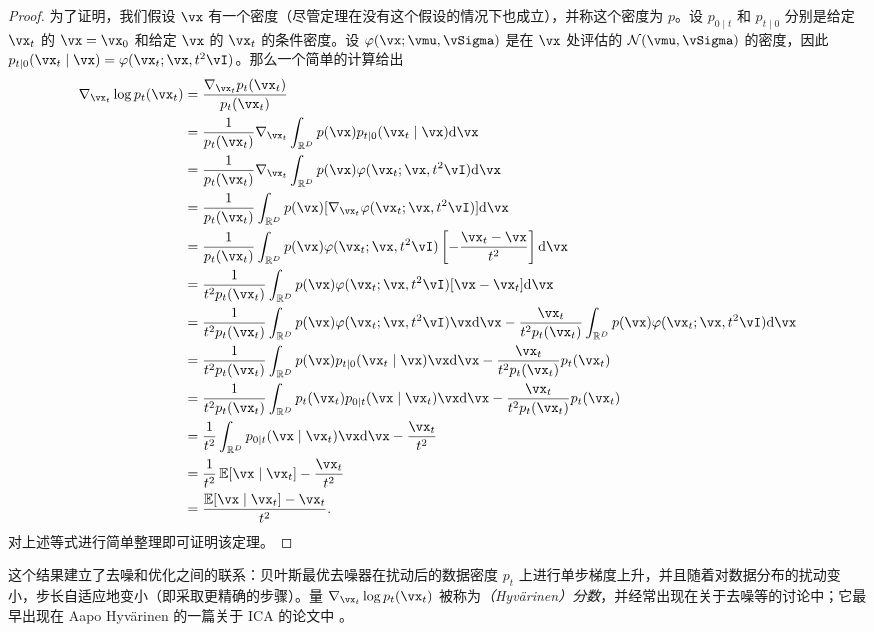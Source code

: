 \documentclass[../../book-main_zh.tex]{subfiles}
\begin{document}
\begin{proof}
	为了证明，我们假设 \(\vx\) 有一个密度（尽管定理在没有这个假设的情况下也成立），并称这个密度为 \(p\)。设 \(p_{0 \mid t}\) 和 \(p_{t \mid 0}\) 分别是给定 \(\vx_{t}\) 的 \(\vx = \vx_{0}\) 和给定 \(\vx\) 的 \(\vx_{t}\) 的条件密度。设 \(\phi(\vx ; \vmu, \vSigma)\) 是在 \(\vx\) 处评估的 \(\dNorm(\vmu, \vSigma)\) 的密度，因此 \(p_{t \mid 0}(\vx_{t} \mid \vx) = \phi(\vx_{t} ; \vx, t^{2}\vI)\)。那么一个简单的计算给出
	\begin{align}
		\nabla_{\vx_{t}} \log p_{t}(\vx_{t})
		&= \frac{\nabla_{\vx_{t}}p_{t}(\vx_{t})}{p_{t}(\vx_{t})} \\
		&= \frac{1}{p_{t}(\vx_{t})}\nabla_{\vx_{t}}\int_{\R^{D}}p(\vx)p_{t \mid 0}(\vx_{t} \mid \vx)\odif{\vx} \\
		&=
		\frac{1}{p_{t}(\vx_{t})}\nabla_{\vx_{t}}\int_{\R^{D}}p(\vx)\phi(\vx_{t}
		;\vx, t^{2}\vI)\odif{\vx} \\
		&=
		\frac{1}{p_{t}(\vx_{t})}\int_{\R^{D}}p(\vx)[\nabla_{\vx_{t}}\phi(\vx_{t}
		;\vx, t^{2}\vI)]\odif{\vx} \\
		&= \frac{1}{p_{t}(\vx_{t})}\int_{\R^{D}}p(\vx)\phi(\vx_{t} ; \vx, t^{2}\vI)\bs{-\frac{\vx_{t} - \vx}{t^{2}}}\odif{\vx} \\
		&= \frac{1}{t^{2}p_{t}(\vx_{t})}\int_{\R^{D}}p(\vx)\phi(\vx_{t} ; \vx, t^{2}\vI)[\vx - \vx_{t}]\odif{\vx} \\
		&= \frac{1}{t^{2}p_{t}(\vx_{t})}\int_{\R^{D}}p(\vx)\phi(\vx_{t} ; \vx,
		t^{2}\vI)\vx \odif{\vx}
		- \frac{\vx_{t}}{t^{2}p_{t}(\vx_{t})}\int_{\R^{D}}p(\vx)\phi(\vx_{t} ; \vx, t^{2}\vI)\odif{\vx} \\
		&= \frac{1}{t^{2}p_{t}(\vx_{t})}\int_{\R^{D}}p(\vx)p_{t \mid 0}(\vx_{t} \mid \vx)\vx \odif{\vx} - \frac{\vx_{t}}{t^{2}p_{t}(\vx_{t})}p_{t}(\vx_{t}) \\
		&= \frac{1}{t^{2}p_{t}(\vx_{t})}\int_{\R^{D}}p_{t}(\vx_{t})p_{0 \mid t}(\vx \mid \vx_{t})\vx \odif{\vx} - \frac{\vx_{t}}{t^{2}p_{t}(\vx_{t})}p_{t}(\vx_{t}) \\
		&= \frac{1}{t^{2}}\int_{\R^{D}}p_{0 \mid t}(\vx \mid \vx_{t})\vx \odif{\vx} - \frac{\vx_{t}}{t^{2}} \\
		&= \frac{1}{t^{2}}\Ex[\vx \mid \vx_{t}] - \frac{\vx_{t}}{t^{2}} \\
		&= \frac{\Ex[\vx \mid \vx_{t}] - \vx_{t}}{t^{2}}.
	\end{align}
	对上述等式进行简单整理即可证明该定理。
\end{proof}
这个结果建立了去噪和优化之间的联系：贝叶斯最优去噪器在扰动后的数据密度 \(p_{t}\) 上进行单步梯度上升，并且随着对数据分布的扰动变小，步长自适应地变小（即采取更精确的步骤）。量 \(\nabla_{\vx_{t}}\log p_{t}(\vx_{t})\) 被称为\textit{（Hyv\"arinen）分数}，并经常出现在关于去噪等的讨论中；它最早出现在 Aapo Hyv\"arinen 的一篇关于 ICA 的论文中 \cite{hyvarinen05a}。
\end{document}
